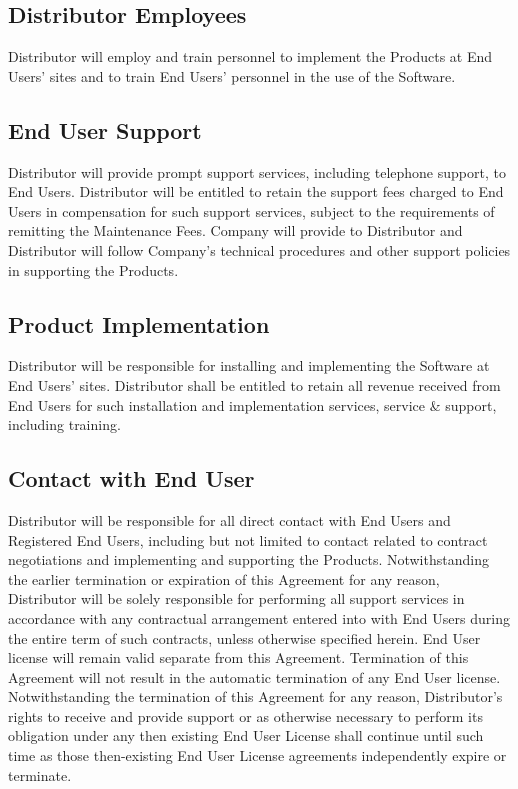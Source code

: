 \documentclass[letterpaper,10pt,openany,oneside,english]{sphinxmanual}
\begin{document}
\subsection{Distributor Employees}
\label{\detokenize{additionalresponsibilities2:distributor-employees}}
Distributor will employ and train personnel to implement the Products at End Users’ sites and to train End Users’ personnel in the use of the Software.


\subsection{End User Support}
\label{\detokenize{additionalresponsibilities2:end-user-support}}
Distributor will provide prompt support services, including telephone support, to End Users. Distributor will be entitled to retain the support fees charged to End Users in compensation for such support services, subject to the requirements of remitting the Maintenance Fees. Company will provide to Distributor and Distributor will follow Company’s technical procedures and other support policies in supporting the Products.


\subsection{Product Implementation}
\label{\detokenize{additionalresponsibilities2:product-implementation}}
Distributor will be responsible for installing and implementing the Software at End Users’ sites. Distributor shall be entitled to retain all revenue received from End Users for such installation and implementation services, service \& support, including training.


\subsection{Contact with End User}
\label{\detokenize{additionalresponsibilities2:contact-with-end-user}}
Distributor will be responsible for all direct contact with End Users and Registered End Users, including but not limited to contact related to contract negotiations and implementing and supporting the Products. Notwithstanding the earlier termination or expiration of this Agreement for any reason, Distributor will be solely responsible for performing all support services in accordance with any contractual arrangement entered into with End Users during the entire term of such contracts, unless otherwise specified herein.  End User license will remain valid separate from this Agreement.  Termination of this Agreement will not result in the automatic termination of any End User license.  Notwithstanding the termination of this Agreement for any reason, Distributor’s rights to receive and provide support or as otherwise necessary to perform its obligation under any then \textendash{} existing End User License shall continue until such time as those then-existing End User License agreements independently expire or terminate.
\end{document}
